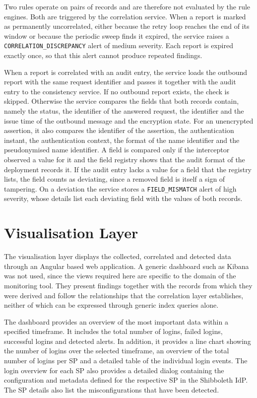 \documentclass[../main.tex]{subfiles}
\begin{document}
Two rules operate on pairs of records and are therefore not evaluated by the rule engines. 
Both are triggered by the correlation service. 
When a report is marked as permanently uncorrelated, either because the retry loop reaches the end 
of its window or because the periodic sweep finds it expired, the service raises a 
\texttt{CORRELATION\_DISCREPANCY} alert of medium severity. 
Each report is expired exactly once, so that this alert cannot produce repeated findings. 
 
When a report is correlated with an audit entry, the service loads the outbound report with the 
same request identifier and passes it together with the audit entry to the consistency service. 
If no outbound report exists, the check is skipped. 
Otherwise the service compares the fields that both records contain, namely the status, the 
identifier of the answered request, the identifier and the issue time of the outbound message and 
the encryption state. 
For an unencrypted assertion, it also compares the identifier of the assertion, the authentication 
instant, the authentication context, the format of the name identifier and the pseudonymised name identifier. 
A field is compared only if the interceptor observed a value for it and the field registry shows 
that the audit format of the deployment records it. 
If the audit entry lacks a value for a field that the registry lists, the field counts as 
deviating, since a removed field is itself a sign of tampering. 
On a deviation the service stores a \texttt{FIELD\_MISMATCH} alert of high severity, whose details 
list each deviating field with the values of both records.

\section{Visualisation Layer}\label{sec:impl-visualisation}

The visualisation layer displays the collected, correlated and detected data through an 
Angular based web application. 
A generic dashboard such as Kibana was not used, since the views required here are specific to 
the domain of the monitoring tool. 
They present findings together with the records from which they were derived and follow the 
relationships that the correlation layer establishes, neither of which can be expressed through 
generic index queries alone. 

The dashboard provides an overview of the most important data within a specified timeframe. 
It includes the total number of logins, failed logins, successful logins and detected alerts. 
In addition, it provides a line chart showing the number of logins over the selected timeframe, 
an overview of the total number of logins per SP and a detailed table of the individual login 
events. 
The login overview for each SP also provides a detailed dialog containing the configuration and 
metadata defined for the respective SP in the Shibboleth IdP. 
The SP details also list the misconfigurations that have been detected. 
\end{document}
